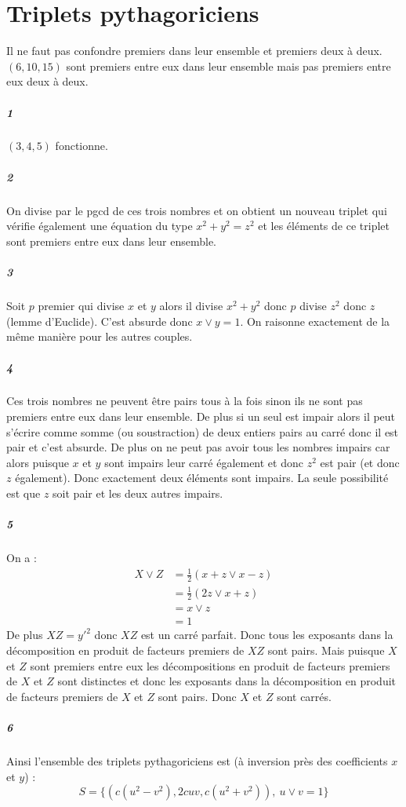 \documentclass[10pt,a4paper]{article}
\begin{document}
\section{Triplets pythagoriciens}
\danger Il ne faut pas confondre premiers dans leur ensemble et premiers deux à deux. $(6, 10, 15)$ sont premiers entre eux dans leur ensemble mais pas premiers entre eux deux à deux.
\subparagraph{1} $(3,4,5)$ fonctionne.
\subparagraph{2}On divise par le pgcd de ces trois nombres et on obtient un nouveau triplet qui vérifie également une équation du type $x^2+y^2=z^2$ et les éléments de ce triplet sont premiers entre eux dans leur ensemble.
\subparagraph{3}Soit $p$ premier qui divise $x$ et $y$ alors il divise $x^2+y^2$ donc $p$ divise $z^2$ donc $z$ (lemme d'Euclide). C'est absurde donc $x \vee y=1$. On raisonne exactement de la même manière pour les autres couples.
\subparagraph{4}Ces trois nombres ne peuvent être pairs tous à la fois sinon ils ne sont pas premiers entre eux dans leur ensemble. De plus si un seul est impair alors il peut s'écrire comme somme (ou soustraction) de deux entiers pairs au carré donc il est pair et c'est absurde. De plus on ne peut pas avoir tous les nombres impairs car alors puisque $x$ et $y$ sont impairs leur carré également et donc $z^2$ est pair (et donc $z$ également). Donc exactement deux éléments sont impairs. La seule possibilité est que $z$ soit pair et les deux autres impairs.
\subparagraph{5}On a :
\begin{equation}
\begin{aligned}
X \vee Z &= \frac{1}{2}(x+z \vee x-z) \\
&=\frac{1}{2}(2z \vee x+z)\\
&=x \vee z \\
&=1
\end{aligned}
\end{equation}
De plus $XZ=y'^2$ donc $XZ$ est un carré parfait. Donc tous les exposants dans la décomposition en produit de facteurs premiers de $XZ$ sont pairs. Mais puisque $X$ et $Z$ sont premiers entre eux les décompositions en produit de facteurs premiers de $X$ et $Z$ sont distinctes et donc les exposants dans la décomposition en produit de facteurs premiers de $X$ et $Z$ sont pairs. Donc $X$ et $Z$ sont carrés.
\subparagraph{6}Ainsi l'ensemble des triplets pythagoriciens est (à inversion près des coefficients $x$ et $y$) :
\begin{equation}
S=\lbrace (c(u^2-v^2), 2cuv, c(u^2+v^2)), \ u \vee v=1 \rbrace
\end{equation}
\end{document}

